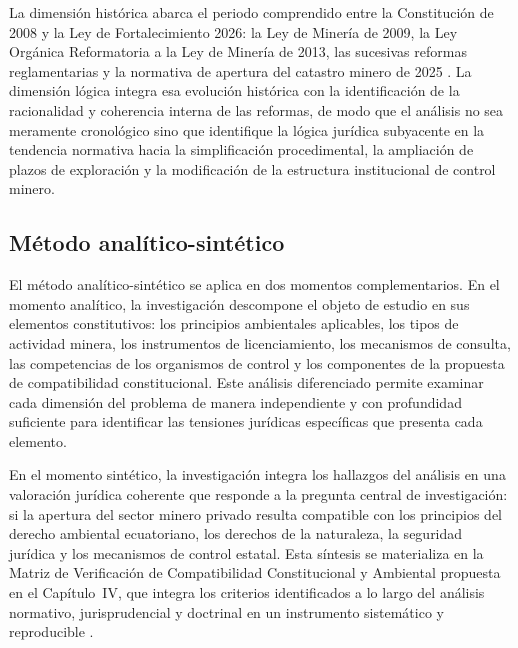 La dimensión histórica abarca el periodo comprendido entre la Constitución de 2008 y la Ley de Fortalecimiento 2026: la Ley de Minería de 2009, la Ley Orgánica Reformatoria a la Ley de Minería de 2013, las sucesivas reformas reglamentarias y la normativa de apertura del catastro minero de 2025 \parencite{ley_mineria_2009,ley_reformatoria_mineria_2013,ley_mineria_2025}. La dimensión lógica integra esa evolución histórica con la identificación de la racionalidad y coherencia interna de las reformas, de modo que el análisis no sea meramente cronológico sino que identifique la lógica jurídica subyacente en la tendencia normativa hacia la simplificación procedimental, la ampliación de plazos de exploración y la modificación de la estructura institucional de control minero.

\subsection{Método analítico-sintético}

El método analítico-sintético se aplica en dos momentos complementarios. En el momento analítico, la investigación descompone el objeto de estudio en sus elementos constitutivos: los principios ambientales aplicables, los tipos de actividad minera, los instrumentos de licenciamiento, los mecanismos de consulta, las competencias de los organismos de control y los componentes de la propuesta de compatibilidad constitucional. Este análisis diferenciado permite examinar cada dimensión del problema de manera independiente y con profundidad suficiente para identificar las tensiones jurídicas específicas que presenta cada elemento.

En el momento sintético, la investigación integra los hallazgos del análisis en una valoración jurídica coherente que responde a la pregunta central de investigación: si la apertura del sector minero privado resulta compatible con los principios del derecho ambiental ecuatoriano, los derechos de la naturaleza, la seguridad jurídica y los mecanismos de control estatal. Esta síntesis se materializa en la Matriz de Verificación de Compatibilidad Constitucional y Ambiental propuesta en el Capítulo~IV, que integra los criterios identificados a lo largo del análisis normativo, jurisprudencial y doctrinal en un instrumento sistemático y reproducible \parencite{ochoa_jimenez_2024,peck_et_al_2024}.

